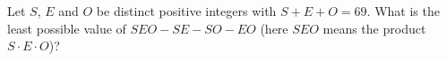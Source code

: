 Let $S$, $E$ and $O$ be distinct positive integers with $S+E+O=69$. What is the least possible value of $SEO-SE-SO-EO$ (here $SEO$ means the product $S\cdot E\cdot O$)?
